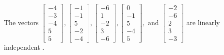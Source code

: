 \begin{exercise}
\begin{exerciseStatement}
  \end{exerciseStatement}
  \begin{exerciseAnswer}
   The vectors \(\left[\begin{array}{r}
-4 \\
-3 \\
-4 \\
5 \\
5
\end{array}\right] , \left[\begin{array}{r}
-1 \\
-1 \\
5 \\
-2 \\
-4
\end{array}\right] , \left[\begin{array}{r}
-6 \\
1 \\
-2 \\
3 \\
-6
\end{array}\right] , \left[\begin{array}{r}
0 \\
-1 \\
5 \\
-4 \\
5
\end{array}\right] , \text{ and } \left[\begin{array}{r}
-2 \\
-6 \\
2 \\
3 \\
-3
\end{array}\right]\) are 
  	 linearly independent  .
  


  \end{exerciseAnswer}
\end{exercise}